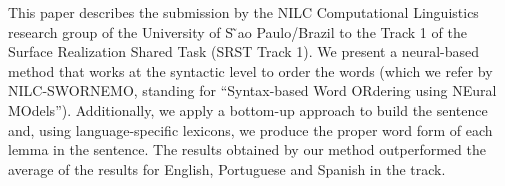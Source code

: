 This paper describes the submission by the NILC Computational Linguistics research group of the University of S ̃ao Paulo/Brazil to the Track 1 of the Surface Realization Shared Task (SRST Track 1). We present a neural-based method that works at the syntactic level to order the words (which we refer by NILC-SWORNEMO, standing for ``Syntax-based Word ORdering using NEural MOdels''). Additionally, we apply a bottom-up approach to build the sentence and, using language-specific lexicons, we produce the proper word form of each lemma in the sentence. The results obtained by our method outperformed the average of the results for English, Portuguese and Spanish in the track.
